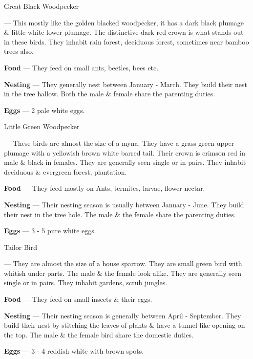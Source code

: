 \begin{bird}{Great Black Woodpecker}

 --- This mostly like the golden blacked woodpecker, it has a dark black plumage \& little white lower plumage. The distinctive dark red crown is what stands out in these birds. They  inhabit rain forest, deciduous forest, sometimes near bamboo trees also.

{\large\bf Food} --- They feed on small ants, beetles, bees etc.

{\large\bf Nesting} --- They generally nest between January - March. They build their nest in the tree hallow. Both the male \& female share the parenting duties.

{\large\bf Eggs} --- 2 pale white eggs.
\end{bird}

\begin{bird}{Little Green Woodpecker}

 --- These birds are almost the size of a myna. They have a grass green upper plumage with a yellowish brown white barred tail. Their crown is crimson red in male \& black in females. They are generally seen single or in pairs. They inhabit deciduous \& evergreen forest, plantation.

{\large\bf Food} --- They feed mostly on Ants, termites, larvae, flower nectar.

{\large\bf Nesting} --- Their nesting season is usually between January - June. They  build their nest in the tree hole. The male \& the female share the parenting duties.

{\large\bf Eggs} --- 3 - 5 pure white eggs.
\end{bird}

\begin{bird}{Tailor Bird}

 --- They are almost the size of a house sparrow. They are small green bird with whitish under parts. The male \& the female look alike. They are generally seen single or in pairs. They inhabit gardens, scrub jungles.

{\large\bf Food} --- They feed on small insects \& their eggs.

{\large\bf Nesting} --- Their nesting season is generally between April - September. They build their nest by stitching the leaves of plants \& have a tunnel like opening on the top. The male \& the female bird share the domestic duties.

{\large\bf Eggs} --- 3 - 4 reddish white with brown spots.
\end{bird}

